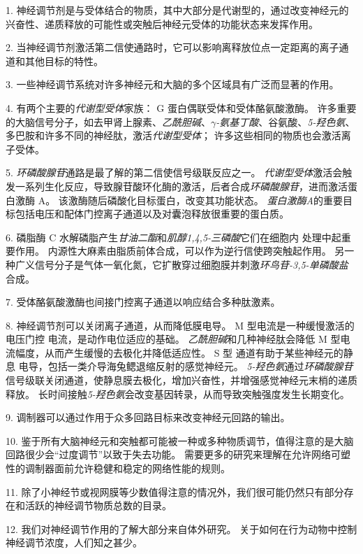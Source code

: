 1. 神经调节剂是与受体结合的物质，其中大部分是代谢型的，通过改变神经元的兴奋性、递质释放的可能性或突触后神经元受体的功能状态来发挥作用。


2. 当神经调节剂激活第二信使通路时，它可以影响离释放位点一定距离的离子通道和其他目标的特性。


3. 一些神经调节系统对许多神经元和大脑的多个区域具有广泛而显著的作用。


4. 有两个主要的\textit{代谢型受体}家族：
G 蛋白偶联受体和受体酪氨酸激酶。 
许多重要的大脑信号分子，如去甲肾上腺素、\textit{乙酰胆碱}、\textit{$\gamma$-氨基丁酸}、谷氨酸、\textit{5-羟色氨}、多巴胺和许多不同的神经肽，激活\textit{代谢型受体}；
许多这些相同的物质也会激活离子受体。 


5. \textit{环磷酸腺苷}通路是最了解的第二信使信号级联反应之一。
\textit{代谢型受体}激活会触发一系列生化反应，导致腺苷酸环化酶的激活，后者合成\textit{环磷酸腺苷}，进而激活蛋白激酶 A。
该激酶随后磷酸化目标蛋白，改变其功能状态。
\textit{蛋白激酶A}的重要目标包括电压和配体门控离子通道以及对囊泡释放很重要的蛋白质。 


6. 磷脂酶 C 水解磷脂产生\textit{甘油二酯}和\textit{肌醇1,4,5-三磷酸}它们在细胞内  处理中起重要作用。
内源性大麻素由脂质前体合成，可以作为逆行信使跨突触起作用。
另一种广义信号分子是气体一氧化氮，它扩散穿过细胞膜并刺激\textit{环鸟苷-3,5-单磷酸盐}合成。


7. 受体酪氨酸激酶也间接门控离子通道以响应结合多种肽激素。 


8. 神经调节剂可以关闭离子通道，从而降低膜电导。
M 型电流是一种缓慢激活的电压门控  电流，是动作电位适应的基础。
\textit{乙酰胆碱}和几种神经肽会降低 M 型电流幅度，从而产生缓慢的去极化并降低适应性。
S 型  通道有助于某些神经元的静息  电导，包括一类介导海兔鳃退缩反射的感觉神经元。
\textit{5-羟色氨}通过\textit{环磷酸腺苷}信号级联关闭通道，使静息膜去极化，增加兴奋性，并增强感觉神经元末梢的递质释放。
长时间接触\textit{5-羟色氨}会改变基因转录，从而导致突触强度发生长期变化。 


9. 调制器可以通过作用于众多回路目标来改变神经元回路的输出。 


10. 鉴于所有大脑神经元和突触都可能被一种或多种物质调节，值得注意的是大脑回路很少会“过度调节”以致于失去功能。
需要更多的研究来理解在允许网络可塑性的调制器面前允许稳健和稳定的网络性能的规则。


11. 除了小神经节或视网膜等少数值得注意的情况外，我们很可能仍然只有部分存在和活跃的神经调节物质总数的目录。


12. 我们对神经调节作用的了解大部分来自体外研究。
关于如何在行为动物中控制神经调节浓度，人们知之甚少。





